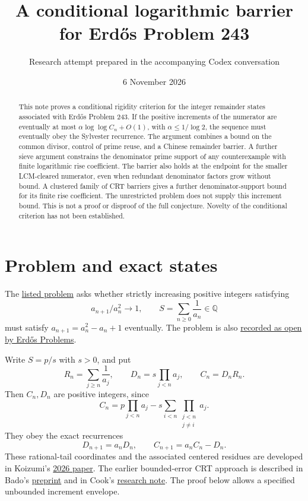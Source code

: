 \documentclass[11pt]{article}
\title{A conditional logarithmic barrier for Erd\H{o}s Problem 243}
\author{Research attempt prepared in the accompanying Codex conversation}
\date{6 November 2026}
\begin{document}
\maketitle

\begin{abstract}
This note proves a conditional rigidity criterion for the integer remainder
states associated with Erd\H{o}s Problem 243. If the positive increments of
the numerator are eventually at most
$\alpha\log\log C_n+O(1)$, with $\alpha\le1/\log 2$, the sequence must
eventually obey the Sylvester recurrence. The argument combines a bound
on the common divisor, control of prime reuse, and a Chinese remainder
barrier. A further sieve argument constrains the denominator prime support
of any counterexample with finite logarithmic rise coefficient.
The barrier also holds at the endpoint for the smaller LCM-cleared
numerator, even when redundant denominator factors grow without bound.
A clustered family of CRT barriers gives a further denominator-support
bound for its finite rise coefficient.
The unrestricted problem does not supply this increment bound.
This is not a proof or disproof of the full conjecture. Novelty of the
conditional criterion has not been established.
\end{abstract}

\section{Problem and exact states}
The \href{https://conjectures.io/problems/erdos243-erdos-243}{listed problem}
asks whether strictly increasing positive integers satisfying
\[
 a_{n+1}/a_n^2\longrightarrow1,
 \qquad S=\sum_{n\ge0}\frac1{a_n}\in\mathbb Q
\]
must satisfy $a_{n+1}=a_n^2-a_n+1$ eventually. The problem is also
\href{https://www.erdosproblems.com/243}{recorded as open by Erd\H{o}s Problems}.

Write $S=p/s$ with $s>0$, and put
\[
 R_n=\sum_{j\ge n}\frac1{a_j},\qquad
 D_n=s\prod_{j<n}a_j,\qquad C_n=D_nR_n.
\]
Then $C_n,D_n$ are positive integers, since
\[
 C_n=p\prod_{j<n}a_j-
 s\sum_{i<n}\prod_{\substack{j<n\\j\ne i}}a_j.
\]
They obey the exact recurrences
\begin{equation}\label{eq:state}
 D_{n+1}=a_nD_n,\qquad C_{n+1}=a_nC_n-D_n.
\end{equation}
These rational-tail coordinates and the associated centered residues are
developed in Koizumi's
\href{https://math.colgate.edu/~integers/aa28/aa28.pdf}{2026 paper}.
The earlier bounded-error CRT approach is described in Bado's
\href{https://www.researchgate.net/publication/413940355}{preprint}
and in Cook's
\href{https://github.com/wcook04/plectis-erdos/blob/main/paper/243/erdos-243-reciprocal-tail-rigidity.tex}{research note}.
The proof below allows a specified unbounded increment envelope.
\end{document}
